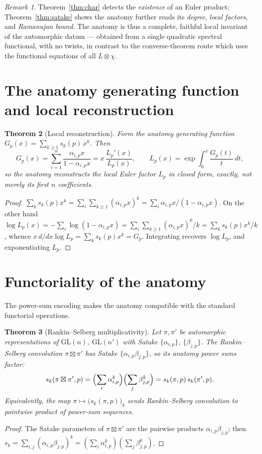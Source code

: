 \documentclass[11pt]{amsart}
\newtheorem{theorem}{Theorem}[section]
\theoremstyle{definition}
\theoremstyle{remark}
\newtheorem{remark}[theorem]{Remark}
\newcommand{\GL}{\mathrm{GL}}
\begin{document}
\begin{remark}
Theorem~\ref{thm:char} detects the \emph{existence} of an Euler product;
Theorem~\ref{thm:satake} shows the anatomy further reads its \emph{degree},
\emph{local factors}, and \emph{Ramanujan bound}. The anatomy is thus a complete,
faithful local invariant of the automorphic datum --- obtained from a single
quadratic spectral functional, with no twists, in contrast to the
converse-theorem route which uses the functional equations of all $L\otimes\chi$.
\end{remark}

\section{The anatomy generating function and local reconstruction}\label{sec:gen}
\begin{theorem}[Local reconstruction]\label{thm:gen}
Form the \emph{anatomy generating function} $G_p(x)=\sum_{k\ge1}s_k(p)\,x^k$.
Then
\[
G_p(x)=\sum_{i=1}^n\frac{\alpha_{i,p}x}{1-\alpha_{i,p}x}=x\,\frac{L_p'(x)}{L_p(x)},
\qquad
L_p(x)=\exp\!\int_0^x\frac{G_p(t)}{t}\,dt,
\]
so the anatomy reconstructs the local Euler factor $L_p$ in closed form, exactly,
not merely its first $n$ coefficients.
\end{theorem}
\begin{proof}
$\sum_k s_k(p)x^k=\sum_i\sum_{k\ge1}(\alpha_{i,p}x)^k=\sum_i\alpha_{i,p}x/
(1-\alpha_{i,p}x)$. On the other hand $\log L_p(x)=-\sum_i\log(1-\alpha_{i,p}x)
=\sum_i\sum_{k\ge1}(\alpha_{i,p}x)^k/k=\sum_k s_k(p)x^k/k$, whence
$x\,d/dx\log L_p=\sum_k s_k(p)x^k=G_p$. Integrating recovers $\log L_p$, and
exponentiating $L_p$.
\end{proof}

\section{Functoriality of the anatomy}\label{sec:funct}
The power-sum encoding makes the anatomy compatible with the standard functorial
operations.

\begin{theorem}[Rankin--Selberg multiplicativity]\label{thm:rs}\sloppy
Let $\pi,\pi'$ be automorphic representations of $\GL(n)$, $\GL(n')$ with Satake
$\{\alpha_{i,p}\}$, $\{\beta_{j,p}\}$. The Rankin--Selberg convolution
$\pi\boxtimes\pi'$ has Satake $\{\alpha_{i,p}\beta_{j,p}\}$, so its anatomy power
sums factor:
\[
s_k(\pi\boxtimes\pi',p)=\Bigl(\sum_i\alpha_{i,p}^k\Bigr)\Bigl(\sum_j\beta_{j,p}^k\Bigr)
=s_k(\pi,p)\,s_k(\pi',p).
\]
Equivalently, the map $\pi\mapsto\bigl(s_k(\pi,p)\bigr)_{k}$ sends Rankin--Selberg
convolution to pointwise product of power-sum sequences.
\end{theorem}
\begin{proof}
The Satake parameters of $\pi\boxtimes\pi'$ are the pairwise products
$\alpha_{i,p}\beta_{j,p}$; then $s_k=\sum_{i,j}(\alpha_{i,p}\beta_{j,p})^k=
(\sum_i\alpha_{i,p}^k)(\sum_j\beta_{j,p}^k)$.
\end{proof}
\end{document}
